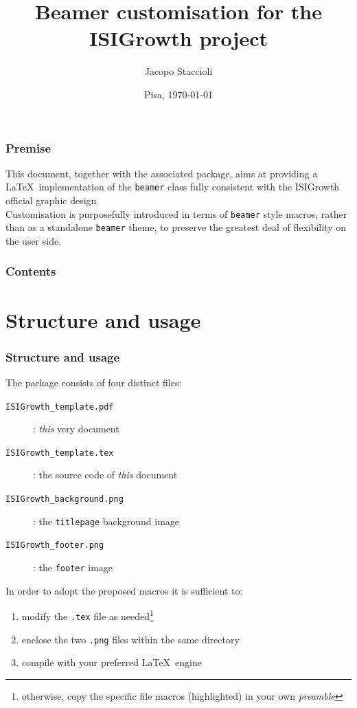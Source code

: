 \documentclass[english]{beamer}
\title[Beamer customisation for the ISIGrowth project]{Beamer customisation for the ISIGrowth project}
\author[Jacopo Staccioli]{Jacopo Staccioli}
\institute{\textsl{Scuola Superiore Sant'Anna}\\[3ex] \texttt{j.staccioli@santannapisa.it}}
\date[Pisa, \today]{Pisa, \today}
\begin{document}
\begin{frame}
\vspace{5ex} %
\titlepage
\end{frame}

\begin{frame}
\frametitle{Premise}
This document, together with the associated package, aims at providing a \LaTeX\ implementation of the \texttt{beamer} class fully consistent with the ISIGrowth official graphic design.\\
\bigskip
Customisation is purposefully introduced in terms of \texttt{beamer} style macros, rather than as a standalone \texttt{beamer} theme, to preserve the greatest deal of flexibility on the user side.
\end{frame}

\begin{frame}
\frametitle{Contents}
\tableofcontents
\end{frame}

\section{Structure and usage}

\begin{frame}
\frametitle{Structure and usage}
The package consists of four distinct files:
\begin{description}
\item[\texttt{ISIGrowth\_template.pdf}]: \emph{this} very document
\item[\texttt{ISIGrowth\_template.tex}]: the source code of \emph{this} document
\item[\texttt{ISIGrowth\_background.png}]: the \texttt{titlepage} background image
\item[\texttt{ISIGrowth\_footer.png}]: the \texttt{footer} image
\end{description}
\bigskip
In order to adopt the proposed macros it is sufficient to:
\begin{enumerate}
\item modify the \texttt{.tex} file as needed\footnote{otherwise, copy the specific file macros (highlighted) in your own \emph{preamble}}
\item enclose the two \texttt{.png} files within the same directory
\item compile with your preferred \LaTeX\ engine
\end{enumerate}
\end{frame}
\end{document}

